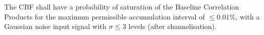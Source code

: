 The CBF shall have a probability of saturation of the Baseline Correlation
Products for the maximum permissible accumulation interval of
$\le 0.01\%$, with a Gaussian noise input signal with
$\sigma \le 3$ levels (after channelisation).
